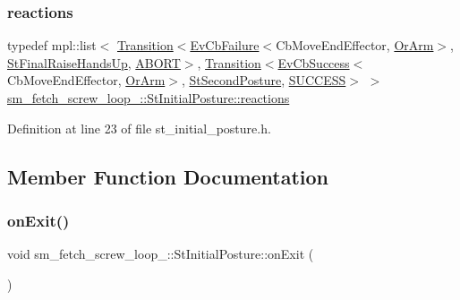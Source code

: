 \subsubsection{\texorpdfstring{reactions}{reactions}}
{\footnotesize\ttfamily typedef mpl\+::list$<$ \hyperlink{classsmacc_1_1Transition}{Transition}$<$\hyperlink{structsmacc_1_1EvCbFailure}{Ev\+Cb\+Failure}$<$Cb\+Move\+End\+Effector, \hyperlink{classsm__fetch__screw__loop__1_1_1OrArm}{Or\+Arm}$>$, \hyperlink{structsm__fetch__screw__loop__1_1_1StFinalRaiseHandsUp}{St\+Final\+Raise\+Hands\+Up}, \hyperlink{structsmacc_1_1default__transition__tags_1_1ABORT}{A\+B\+O\+RT}$>$, \hyperlink{classsmacc_1_1Transition}{Transition}$<$\hyperlink{structsmacc_1_1EvCbSuccess}{Ev\+Cb\+Success}$<$Cb\+Move\+End\+Effector, \hyperlink{classsm__fetch__screw__loop__1_1_1OrArm}{Or\+Arm}$>$, \hyperlink{structsm__fetch__screw__loop__1_1_1StSecondPosture}{St\+Second\+Posture}, \hyperlink{structsmacc_1_1default__transition__tags_1_1SUCCESS}{S\+U\+C\+C\+E\+SS}$>$ $>$ \hyperlink{structsm__fetch__screw__loop__1_1_1StInitialPosture_a934e72dcb94334528eecd0dd4e1251f0}{sm\+\_\+fetch\+\_\+screw\+\_\+loop\+\_\+::\+St\+Initial\+Posture\+::reactions}}



Definition at line 23 of file st\+\_\+initial\+\_\+posture.\+h.



\subsection{Member Function Documentation}
\mbox{\label{structsm__fetch__screw__loop__1_1_1StInitialPosture_a9ddbfdfcb1e685f4b6d9ffccd59830dc}} 
\subsubsection{\texorpdfstring{on\+Exit()}{onExit()}}
{\footnotesize\ttfamily void sm\+\_\+fetch\+\_\+screw\+\_\+loop\+\_\+::\+St\+Initial\+Posture\+::on\+Exit (\begin{DoxyParamCaption}{ }\end{DoxyParamCaption})\hspace{0.3cm}{\ttfamily [inline]}}



